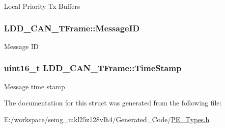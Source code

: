 Local Priority Tx Buffers \hypertarget{struct_l_d_d___c_a_n___t_frame_ab6f347f42b51e9ae318e04cdce84c82c}{
\subsubsection[{Message\-I\-D}]{ L\-D\-D\-\_\-\-C\-A\-N\-\_\-\-T\-Frame\-::\-Message\-I\-D}}\label{struct_l_d_d___c_a_n___t_frame_ab6f347f42b51e9ae318e04cdce84c82c}
Message I\-D \hypertarget{struct_l_d_d___c_a_n___t_frame_a9bab04fefdcfc101f718355bc6e20eb4}{
\subsubsection[{Time\-Stamp}]{\setlength{\rightskip}{0pt plus 5cm}uint16\-\_\-t L\-D\-D\-\_\-\-C\-A\-N\-\_\-\-T\-Frame\-::\-Time\-Stamp}}\label{struct_l_d_d___c_a_n___t_frame_a9bab04fefdcfc101f718355bc6e20eb4}
Message time stamp 

The documentation for this struct was generated from the following file\-:\begin{DoxyCompactItemize}
\item 
E\-:/workspace/semg\-\_\-mkl25z128vlh4/\-Generated\-\_\-\-Code/\hyperlink{_p_e___types_8h}{P\-E\-\_\-\-Types.\-h}\end{DoxyCompactItemize}
